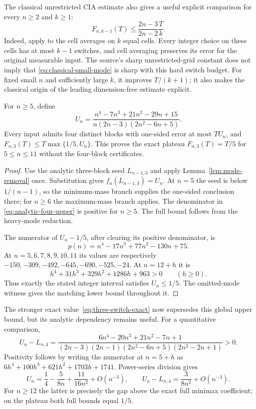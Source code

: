 The classical unrestricted CIA estimate also gives a useful explicit
comparison for every $n\ge2$ and $k\ge1$:
\begin{equation}\label{eq:classical-small-mode}
 F_{n,k-1}(T)\le\frac{2n-3}{2n-2}\frac{T}{k}.
\end{equation}
Indeed, apply \citet[Corollary~1, p.~669]{zeile2021dwell} to the cell averages
on $k$ equal cells. Every integer choice on these cells has at most $k-1$
switches, and cell averaging preserves its error for the original measurable
input. The source's sharp unrestricted-grid constant does not imply that
\eqref{eq:classical-small-mode} is sharp with this hard switch budget. For
fixed small $n$ and sufficiently large $k$, it improves $T/(k+1)$; it also
makes the classical origin of the leading dimension-free estimate explicit.

\begin{proposition}
\label{prop:analytic-four-upper}
For $n\ge5$, define
\begin{equation}\label{eq:analytic-four-upper}
 U_n=\frac{n^4-7n^3+21n^2-29n+15}
 {n(2n-3)(2n^2-6n+5)}.
\end{equation}
Every input admits four distinct blocks with one-sided error at most
$TU_n$, and $F_{n,3}(T)\le T\max\{1/5,U_n\}$.
This proves the exact plateau $F_{n,3}(T)=T/5$ for $5\le n\le11$
without the four-block certificates.
\end{proposition}
\begin{proof}
Use the analytic three-block seed $L_{n-1,3}$ and apply
Lemma~\ref{lem:mode-removal} once. Substitution gives
$f_n(L_{n-1,3})=U_n$. At $n=5$ the seed is below $1/(n-1)$,
so the minimum-mass branch supplies the one-sided conclusion there;
for $n\ge6$ the maximum-mass branch applies. The denominator in
\eqref{eq:analytic-four-upper} is positive for $n\ge5$.
The full bound follows from the heavy-mode reduction.

The numerator of $U_n-1/5$, after clearing its positive denominator, is
\[
 p(n)=n^4-17n^3+77n^2-130n+75.
\]
At $n=5,6,7,8,9,10,11$ its values are respectively
$-150,-309,-492,-645,-690,-525,-24$. At $n=12+h$ it is
\[
 h^4+31h^3+329h^2+1286h+963>0\qquad(h\ge0).
\]
Thus exactly the stated integer interval satisfies $U_n\le1/5$.
The omitted-mode witness gives the matching lower bound throughout it.
\end{proof}

The stronger exact value~\eqref{eq:three-switch-exact} now supersedes
this global upper bound, but its analytic dependency remains useful.
For a quantitative comparison,
\begin{equation}\label{eq:analytic-four-gap}
 U_n-L_{n,4}=
 \frac{6n^4-20n^3+21n^2-7n+1}
 {(2n-3)(2n-1)(2n^2-6n+5)(2n^2-2n+1)}>0.
\end{equation}
Positivity follows by writing the numerator at $n=5+h$ as
$6h^4+100h^3+621h^2+1703h+1741$. Power-series division gives
\[
 U_n=\frac14-\frac5{8n}+\frac{11}{16n^2}+O(n^{-3}),\qquad
 U_n-L_{n,4}=\frac3{8n^2}+O(n^{-3}).
\]
For $n\ge12$ the latter is precisely the gap above the exact full
minimax coefficient; on the plateau both full bounds equal $1/5$.

